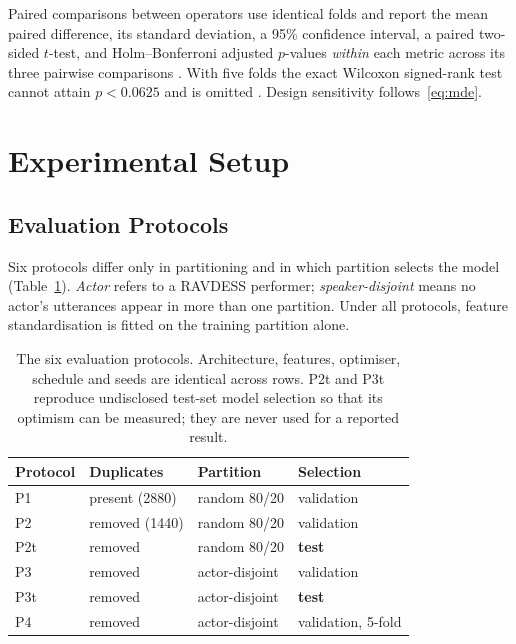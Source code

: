\documentclass[journal,onecolumn,11pt,draftclsnofoot]{IEEEtran}   %
\begin{document}
Paired comparisons between operators use identical folds and report the mean
paired difference, its standard deviation, a 95\% confidence interval, a paired
two-sided $t$-test, and Holm--Bonferroni adjusted $p$-values \emph{within} each
metric across its three pairwise comparisons \cite{demsar2006statistical,
dietterich1998tests}. With five folds the exact Wilcoxon signed-rank test cannot
attain $p < 0.0625$ and is omitted \cite{card2020power}. Design sensitivity
follows~\eqref{eq:mde}.

\section{Experimental Setup}
\label{sec:setup}

\subsection{Evaluation Protocols}
Six protocols differ only in partitioning and in which partition selects the
model (Table~\ref{tab:protocols}). \emph{Actor} refers to a RAVDESS performer;
\emph{speaker-disjoint} means no actor's utterances appear in more than one
partition. Under all protocols, feature standardisation is fitted on the
training partition alone.

\begin{table}[!t]
\centering\small
\caption{The six evaluation protocols. Architecture, features, optimiser,
schedule and seeds are identical across rows. P2t and P3t reproduce undisclosed
test-set model selection so that its optimism can be measured; they are never
used for a reported result.}
\label{tab:protocols}
\begin{tabular}{@{}llll@{}}
\toprule
\textbf{Protocol} & \textbf{Duplicates} & \textbf{Partition} &
\textbf{Selection} \\
\midrule
P1  & present (2880) & random 80/20   & validation \\
P2  & removed (1440) & random 80/20   & validation \\
P2t & removed        & random 80/20   & \textbf{test} \\
P3  & removed        & actor-disjoint & validation \\
P3t & removed        & actor-disjoint & \textbf{test} \\
P4  & removed        & actor-disjoint & validation, 5-fold \\
\bottomrule
\end{tabular}
\end{table}
\end{document}

